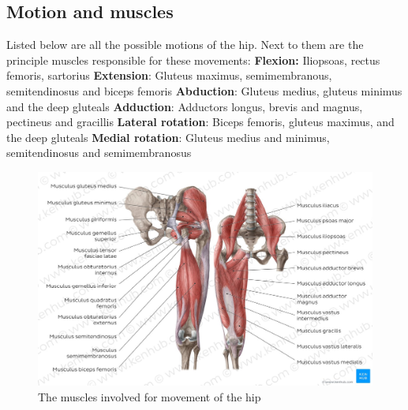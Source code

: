 \documentclass[whitelogo]{tudelft-report}
\begin{document}
{\subsection{Motion and muscles}
Listed below are all the possible motions of the hip. Next to them are the principle muscles responsible for these movements:\newline
\textbf{Flexion:}
Iliopsoas, rectus femoris, sartorius \newline
\textbf{Extension}:
Gluteus maximus, semimembranous, semitendinosus and biceps femoris \newline
\textbf{Abduction}:
Gluteus medius, gluteus minimus and the deep gluteals \newline
\textbf{Adduction}:
Adductors longus, brevis and magnus, pectineus and gracillis \newline
\textbf{Lateral rotation}:
Biceps femoris, gluteus maximus, and the deep gluteals \newline
\textbf{Medial rotation}:
Gluteus medius and minimus, semitendinosus and semimembranosus \newline
	
\begin{figure}[!htb]
	\includegraphics[width=1\linewidth]{hip_muscles.jpg}
	\caption{The muscles involved for movement of the hip~\cite{Hipmuscles2018}}
		\label{fig:my_label}
\end{figure}

}
\end{document}
